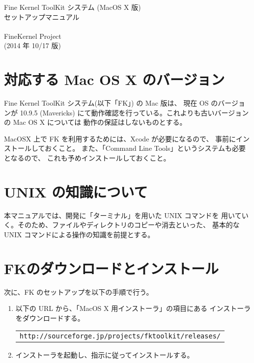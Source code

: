 \documentclass[a4j]{jarticle}
\begin{document}
\begin{center}
{\LARGE Fine Kernel ToolKit システム (MacOS X 版) \\
	セットアップマニュアル} \\ ~ \\
{\Large FineKernel Project} \\
(2014 年 10/17 版)
\end{center}

\section{対応する Mac OS X のバージョン}
Fine Kernel ToolKit システム(以下「FK」) の Mac 版は、
現在 OS のバージョンが 10.9.5 (Mavericks)
にて動作確認を行っている。これよりも古いバージョンの Mac OS X については
動作の保証はしないものとする。

MacOSX 上で FK を利用するためには、Xcode が必要になるので、
事前にインストールしておくこと。
また、「Command Line Tools」というシステムも必要となるので、
これも予めインストールしておくこと。

\section{UNIX の知識について}
本マニュアルでは、開発に「ターミナル」を用いた UNIX コマンドを
用いていく。そのため、ファイルやディレクトリのコピーや消去といった、
基本的な UNIX コマンドによる操作の知識を前提とする。

\section{FKのダウンロードとインストール}
次に、FK のセットアップを以下の手順で行う。
\begin{enumerate}
\item 以下の URL から、「MacOS X 用インストーラ」の項目にある
	インストーラをダウンロードする。
	\begin{center}
	\begin{tabular}{c}
	\verb+http://sourceforge.jp/projects/fktoolkit/releases/+
	\end{tabular}
	\end{center}

\item インストーラを起動し、指示に従ってインストールする。
\end{enumerate}
\end{document}

